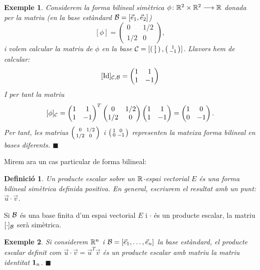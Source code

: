 \documentclass[
  11pt,
]{book}
\numberwithin{dummy}{section}
\theoremstyle{maincolornumbox}
\theoremstyle{blacknumex}
\newtheorem{exampleT}{Exemple}[chapter]
\theoremstyle{blacknumbox}
\newtheorem{definitionT}{Definició}[chapter]
\theoremstyle{maincolornum}
\newenvironment{definition}{\begin{dBox}\begin{definitionT}}{\end{definitionT}\end{dBox}}
\newenvironment{example}{\begin{exampleT}}{\hfill{\tiny\ensuremath{\blacksquare}}\end{exampleT}}
\newlength\esp
\begin{document}
\begin{example}
Considerem la forma bilineal simètrica
\(\phi\colon \mathbb{R}^2 \times \mathbb{R}^2 \longrightarrow \mathbb{R}\) donada per la matriu (en la base
estàndard \(\mathcal{B}=[\vec e_1,\vec e_2]\))
\[[\phi]=\begin{pmatrix} 0 & 1/2 \\ 1/2 & 0 \end{pmatrix},\] i volem
calcular la matriu de \(\phi\) en la base
\(\mathcal{C}=[\left(\begin{smallmatrix}1\\1\end{smallmatrix}\right),\left(\begin{smallmatrix}1\\-1\end{smallmatrix}\right)]\). Llavors hem de calcular:
\[[\operatorname{Id}]_{\mathcal{C},\mathcal{B}}=\begin{pmatrix} 1 & 1 \\ 1 & -1 \end{pmatrix}\] I
per tant la matriu
\[[\phi]_{\mathcal{C}} = \begin{pmatrix} 1 & 1 \\ 1 & -1 \end{pmatrix}^T
\begin{pmatrix} 0 & 1/2 \\ 1/2 & 0 \end{pmatrix}
\begin{pmatrix} 1 & 1 \\ 1 & -1 \end{pmatrix}=
\begin{pmatrix} 1 & 0 \\ 0 & -1 \end{pmatrix}.\] Per tant, les matrius
\(\left(\begin{smallmatrix}0 & 1/2 \\ 1/2 & 0\end{smallmatrix}\right)\) i \(\left(\begin{smallmatrix}1 & 0 \\ 0 & -1\end{smallmatrix}\right)\) representen la
mateixa forma bilineal en bases diferents.
\end{example}

Mirem ara un cas particular de forma bilineal:

\begin{definition}
Un \emph{producte escalar} sobre un \(\mathbb{R}\)-espai vectorial \(E\) és una forma
bilineal simètrica definida positiva. En general, escriurem el resultat
amb un punt: \(\vec u \cdot \vec v\).
\end{definition}

Si \(\mathcal{B}\) és una base finita d'un espai vectorial \(E\) i \(\cdot\) és un
producte escalar, la matriu \([\cdot]_{\mathcal{B}}\) serà simètrica.

\begin{example}
Si considerem \(\mathbb{R}^n\) i \(\mathcal{B}=[\vec e_1, \ldots, \vec e_n]\) la base
estàndard, el producte escalar definit com
\(\vec u \cdot \vec v=\vec u^T \vec v\) és un producte escalar amb matriu
la matriu identitat \(\mathbf{1}_n\).
\end{example}
\end{document}
